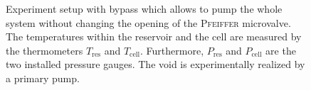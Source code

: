 \documentclass[../../thesis.tex]{subfiles}
\begin{document}
\begin{figure}[ht]
    \caption{Experiment setup with bypass which allows to pump the whole system without changing the opening of the \textsc{Pfeiffer} microvalve. The temperatures within the reservoir and the cell are measured by the thermometers $T_\mathrm{res}$ and $T_\mathrm{cell}$. Furthermore, $P_\mathrm{res}$ and $P_\mathrm{cell}$ are the two installed pressure gauges. The void is experimentally realized by a primary pump.}
    \label{fig:setup-bypass}
\end{figure}
\end{document}

